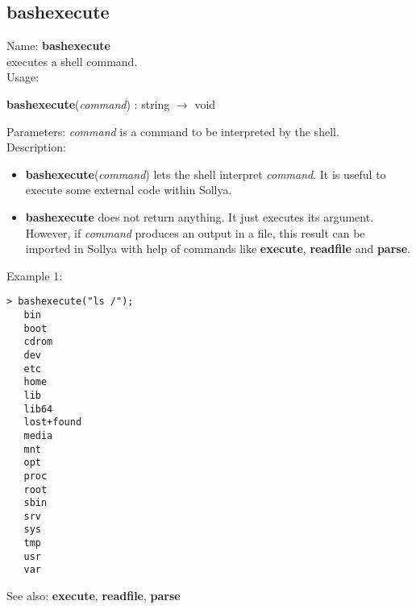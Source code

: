 \subsection{ bashexecute }
\noindent Name: \textbf{bashexecute}\\
executes a shell command.\\

\noindent Usage: 
\begin{center}
\textbf{bashexecute}(\emph{command}) : \textsf{string} $\rightarrow$ \textsf{void}\\
\end{center}
Parameters: 
\emph{command} is a command to be interpreted by the shell.\\

\noindent Description: \begin{itemize}

\item \textbf{bashexecute}(\emph{command}) lets the shell interpret \emph{command}. It is useful to execute
   some external code within Sollya.

\item \textbf{bashexecute} does not return anything. It just executes its argument. However, if
   \emph{command} produces an output in a file, this result can be imported in Sollya
   with help of commands like \textbf{execute}, \textbf{readfile} and \textbf{parse}.
\end{itemize}
\noindent Example 1: 
\begin{center}\begin{minipage}{14.8cm}\begin{Verbatim}[frame=single]
   > bashexecute("ls /");
   bin
   boot
   cdrom
   dev
   etc
   home
   lib
   lib64
   lost+found
   media
   mnt
   opt
   proc
   root
   sbin
   srv
   sys
   tmp
   usr
   var
\end{Verbatim}
\end{minipage}\end{center}
See also: \textbf{execute}, \textbf{readfile}, \textbf{parse}
